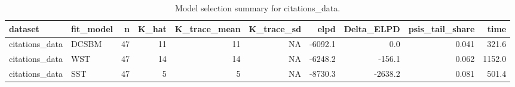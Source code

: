 \begin{table}

\caption{\label{tab:tab:model_selection_citations_data}Model selection summary for citations_data.}
\centering
\begin{tabular}[t]{llrrrrrrrr}
\toprule
dataset & fit\_model & n & K\_hat & K\_trace\_mean & K\_trace\_sd & elpd & Delta\_ELPD & psis\_tail\_share & time\\
\midrule
citations\_data & DCSBM & 47 & 11 & 11 & NA & -6092.1 & 0.0 & 0.041 & 321.6\\
citations\_data & WST & 47 & 14 & 14 & NA & -6248.2 & -156.1 & 0.062 & 1152.0\\
citations\_data & SST & 47 & 5 & 5 & NA & -8730.3 & -2638.2 & 0.081 & 501.4\\
\bottomrule
\end{tabular}
\end{table}
